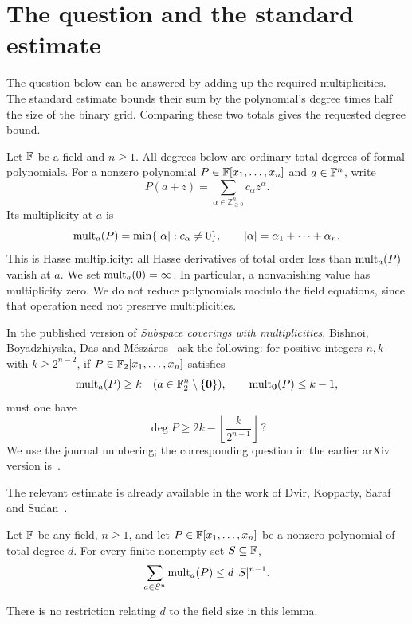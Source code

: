 \section{The question and the standard estimate}

The question below can be answered by adding up the required multiplicities.
The standard estimate bounds their sum by the polynomial's degree times
half the size of the binary grid. Comparing these two totals gives the
requested degree bound.

Let \(\mathbb F\) be a field and \(n\ge1\).
All degrees below are ordinary total degrees of formal polynomials.
For a nonzero polynomial \(P\in\mathbb F[x_1,\ldots,x_n]\) and \(a\in\mathbb F^n\),
write
\[
 P(a+z)=\sum_{\alpha\in\mathbb Z_{\ge0}^n}c_\alpha z^\alpha.
\]
Its multiplicity at \(a\) is
\[
 \operatorname{mult}_a(P)=\min\{|\alpha|:c_\alpha\ne0\},
 \qquad |\alpha|=\alpha_1+\cdots+\alpha_n.
\]
This is Hasse multiplicity: all Hasse derivatives of total order less
than \(\operatorname{mult}_a(P)\) vanish at \(a\). We set \(\operatorname{mult}_a(0)=\infty\).
In particular, a nonvanishing value has multiplicity zero. We do not
reduce polynomials modulo the field equations, since that operation
need not preserve multiplicities.

In the published version of \emph{Subspace coverings with multiplicities},
Bishnoi, Boyadzhiyska, Das and M\'esz\'aros~\cite[Question~4.3]{BBDM23}
ask the following: for positive integers \(n,k\) with \(k\ge2^{n-2}\),
if \(P\in\mathbb F_2[x_1,\ldots,x_n]\) satisfies
\begin{equation}\label{eq:hypotheses}
 \operatorname{mult}_a(P)\ge k\quad(a\in\mathbb F_2^n\setminus\{\mathbf 0\}),
 \qquad \operatorname{mult}_\mathbf 0(P)\le k-1,
\end{equation}
must one have
\begin{equation}\label{eq:question-bound}
 \deg P\ge 2k-\left\lfloor\frac{k}{2^{n-1}}\right\rfloor\,?
\end{equation}
We use the journal numbering; the corresponding question in the earlier
arXiv version is~\cite[Question~5.2]{BBDM21}.

The relevant estimate is already available in the work of Dvir,
Kopparty, Saraf and Sudan~\cite[Definition~2.2 and Lemma~2.7]{DKSS13}.

\begin{lemma}\label{lem:msz}
Let \(\mathbb F\) be any field, \(n\ge1\), and let
\(P\in\mathbb F[x_1,\ldots,x_n]\) be a nonzero polynomial of total degree \(d\).
For every finite nonempty set \(S\subseteq\mathbb F\),
\begin{equation}\label{eq:msz}
 \sum_{a\in S^n}\operatorname{mult}_a(P)\le d\,|S|^{n-1}.
\end{equation}
\end{lemma}
There is no restriction relating \(d\) to the field size in this lemma.
